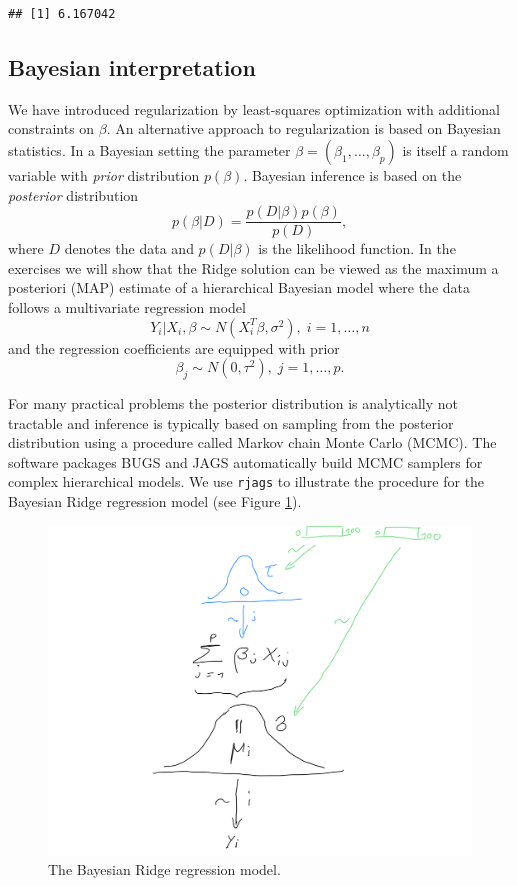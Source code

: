 \documentclass[
]{book}
\begin{document}
\begin{verbatim}
## [1] 6.167042
\end{verbatim}

\hypertarget{bayesian-interpretation}{%
\subsection{Bayesian interpretation}\label{bayesian-interpretation}}

We have introduced regularization by least-squares optimization with additional constraints on \(\beta\). An alternative approach to regularization is based on Bayesian statistics. In a Bayesian setting the parameter \(\beta=(\beta_1,\ldots,\beta_p)\) is itself a random variable with \emph{prior} distribution \(p(\beta)\). Bayesian inference is based on the \emph{posterior} distribution \[p(\beta|D)=\frac{p(D|\beta)p(\beta)}{p(D)},\]
where \(D\) denotes the data and \(p(D|\beta)\) is the likelihood function. In the exercises we will show that the Ridge solution can be viewed as the maximum a posteriori (MAP) estimate of a hierarchical Bayesian model where the data follows a multivariate regression model
\[Y_i|X_i,\beta\sim N(X_i^T\beta,\sigma^2),\; i=1,\ldots,n\]
and the regression coefficients are equipped with prior
\[\beta_j \sim N(0,\tau^2),\; j=1,\ldots,p.\]

For many practical problems the posterior distribution is analytically not tractable and inference is typically based on sampling from the posterior distribution using a procedure called Markov chain Monte Carlo (MCMC). The software packages BUGS and JAGS automatically build MCMC samplers for complex hierarchical models. We use \texttt{rjags} to illustrate the procedure for the Bayesian Ridge regression model (see Figure \ref{fig:bayesianridge}).

\begin{figure}

{\centering \includegraphics[width=0.8\linewidth]{bayesian_ridge} 

}

\caption{The Bayesian Ridge regression model.}\label{fig:bayesianridge}
\end{figure}
\end{document}
